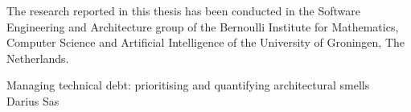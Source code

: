 \thispagestyle{empty}
\noindent

The research reported in this thesis has been conducted in the Software Engineering and Architecture group of the Bernoulli Institute for Mathematics, Computer Science and Artificial Intelligence of the University of Groningen, The Netherlands. 

\vfill\vfill\vfill


\vspace*{\fill}

\noindent Managing technical debt: prioritising and quantifying architectural smells\\
\noindent Darius Sas\\

\normalsize
\newpage